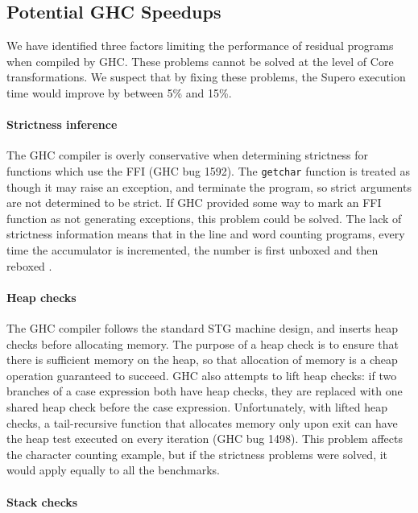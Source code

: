 \subsection{Potential GHC Speedups}

We have identified three factors limiting the performance of residual programs when compiled by GHC. These problems cannot be solved at the level of Core transformations. We suspect that by fixing these problems, the Supero execution time would improve by between 5\% and 15\%.

\paragraph{Strictness inference}

The GHC compiler is overly conservative when determining strictness for functions which use the FFI (GHC bug 1592). The \texttt{getchar} function is treated as though it may raise an exception, and terminate the program, so strict arguments are not determined to be strict. If GHC provided some way to mark an FFI function as not generating exceptions, this problem could be solved. The lack of strictness information means that in the line and word counting programs, every time the accumulator is incremented, the number is first unboxed and then reboxed \cite{spj:unboxing}.

\paragraph{Heap checks}

The GHC compiler follows the standard STG machine \cite{spj:stg} design, and inserts heap checks before allocating memory. The purpose of a heap check is to ensure that there is sufficient memory on the heap, so that allocation of memory is a cheap operation guaranteed to succeed. GHC also attempts to lift heap checks: if two branches of a case expression both have heap checks, they are replaced with one shared heap check before the case expression. Unfortunately, with lifted heap checks, a tail-recursive function that allocates memory only upon exit can have the heap test executed on every iteration (GHC bug 1498). This problem affects the character counting example, but if the strictness problems were solved, it would apply equally to all the benchmarks.

\paragraph{Stack checks}

